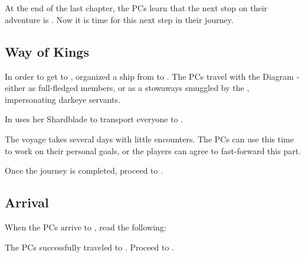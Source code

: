 \section{\locationUrithiru}
\label{sec:urithiru}

At the end of the last chapter, the PCs learn that the next stop on their adventure is \locationUrithiru{}. Now it is time for this next step in their journey.



\subsection{Way of Kings}

In order to get to \locationUrithiru{}, \npcTaravangian{} organized a ship from \locationKharbranth{} to \locationVedenar{}. The PCs travel with the Diagram - either as full-fledged members, or as a stowaways smuggled by the \npcFractionGhostbloods{}, impersonating darkeye servants.

In \locationVedenar{} \npcMalata{} uses her Shardblade to transport everyone to \locationUrithiru{}.

The voyage takes several days with little encounters. The PCs can use this time to work on their personal goals, or the players can agree to fast-forward this part.

Once the journey is completed, proceed to .




\subsection{Arrival}
\label{ssec:urithiruArrival}

When the PCs arrive to \locationUrithiru{}, read the following:


The PCs successfully traveled to \locationUrithiru{}. Proceed to .





